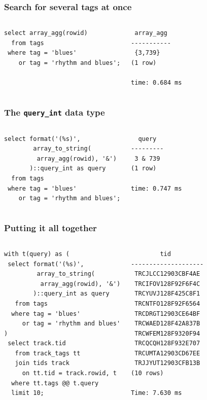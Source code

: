 \documentclass{beamer}
\begin{document}
\begin{frame}[fragile]
  \frametitle{Search for several tags at once}

  \vfill

\begin{columns}
\begin{verbatim}
select array_agg(rowid)
  from tags
 where tag = 'blues'
    or tag = 'rhythm and blues';
\end{verbatim}  
\begin{verbatim}
 array_agg 
-----------
 {3,739}
(1 row)

time: 0.684 ms
\end{verbatim}  
\end{columns}
\end{frame}

\begin{frame}[fragile]
  \frametitle{The \texttt{query\_int} data type}

  \vfill

\begin{columns}
\begin{verbatim}
select format('(%s)',
        array_to_string(
         array_agg(rowid), '&')
       )::query_int as query
  from tags
 where tag = 'blues'
    or tag = 'rhythm and blues';
\end{verbatim}  
\begin{verbatim}
  query  
---------
 3 & 739
(1 row)

time: 0.747 ms
\end{verbatim}  
\end{columns}
\end{frame}

\begin{frame}[fragile]
  \frametitle{Putting it all together}

\begin{columns}
\begin{verbatim}
with t(query) as (
 select format('(%s)',
         array_to_string(
          array_agg(rowid), '&')
        )::query_int as query
   from tags
  where tag = 'blues'
     or tag = 'rhythm and blues'
)
 select track.tid
   from track_tags tt
   join tids track
     on tt.tid = track.rowid, t
  where tt.tags @@ t.query
  limit 10;
\end{verbatim}  
\begin{verbatim}
        tid         
--------------------
 TRCJLCC12903CBF4AE
 TRCIFOV128F92F6F4C
 TRCYUVJ128F425C8F1
 TRCNTFO128F92F6564
 TRCDRGT12903CE64BF
 TRCWAED128F42A837B
 TRCWFEM128F9320F94
 TRCQCQH128F932E707
 TRCUMTA12903CD67EE
 TRJJYUT12903CFB13B
(10 rows)

Time: 7.630 ms
\end{verbatim}  
\end{columns}
\end{frame}
\end{document}
